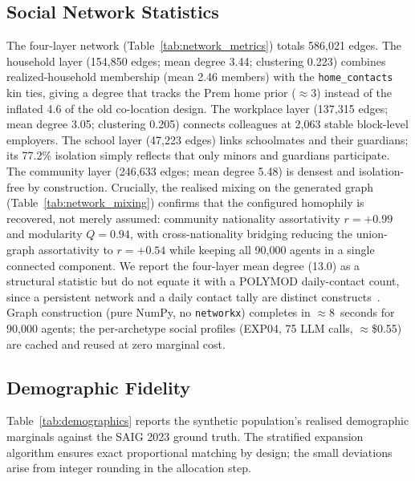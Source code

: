 \documentclass[a4paper,12pt]{article}
\begin{document}
\subsection{Social Network Statistics}
\label{subsec:network_results}

The four-layer network (Table~\ref{tab:network_metrics}) totals 586{,}021 edges.
The household layer (154{,}850 edges; mean degree 3.44; clustering 0.223) combines
realized-household membership (mean 2.46 members) with the \texttt{home\_contacts}
kin ties, giving a degree that tracks the Prem home prior ($\approx$3) instead of the
inflated 4.6 of the old co-location design. The workplace layer (137{,}315 edges; mean
degree 3.05; clustering 0.205) connects colleagues at 2{,}063 stable block-level
employers. The school layer (47{,}223 edges) links schoolmates and their guardians;
its 77.2\% isolation simply reflects that only minors and guardians participate. The
community layer (246{,}633 edges; mean degree 5.48) is densest and isolation-free by
construction. Crucially, the realised mixing on the generated graph
(Table~\ref{tab:network_mixing}) confirms that the configured homophily is recovered,
not merely assumed: community nationality assortativity $r=+0.99$ and modularity
$Q=0.94$, with cross-nationality bridging reducing the union-graph assortativity to
$r=+0.54$ while keeping all 90{,}000 agents in a single connected component. We report
the four-layer mean degree (13.0) as a structural statistic but do not equate it with a
POLYMOD daily-contact count, since a persistent network and a daily contact tally are
distinct constructs~\cite{danon2013social}. Graph construction (pure NumPy, no
\texttt{networkx}) completes in $\approx$8~seconds for 90,000 agents; the per-archetype
social profiles (EXP04, 75 LLM calls, $\approx$\$0.55) are cached and reused at zero
marginal cost.

\subsection{Demographic Fidelity}
\label{subsec:demographic_fidelity}

Table~\ref{tab:demographics} reports the synthetic population's realised
demographic marginals against the SAIG 2023 ground truth. The stratified
expansion algorithm ensures exact proportional matching by design; the
small deviations arise from integer rounding in the allocation step.
\end{document}
